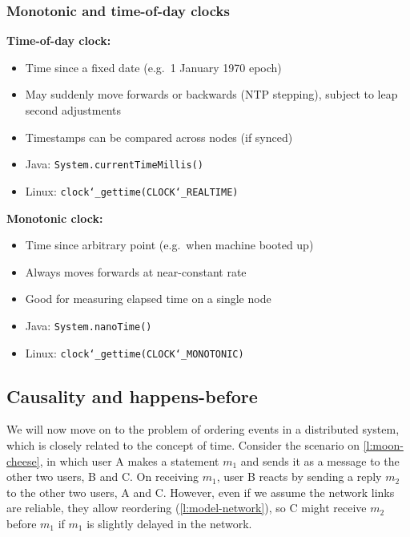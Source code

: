 \begin{frame}
    \label{s:monotonic-comparison}
    \frametitle{Monotonic and time-of-day clocks}
    \textbf{Time-of-day clock:}
    \begin{itemize}
        \item<1-> Time since a fixed date (e.g.\ 1 January 1970 epoch)
        \item<2-> May suddenly move forwards or backwards (NTP stepping), subject to leap second adjustments
        \item<3-> Timestamps can be compared across nodes (if synced)
        \item<4-> Java: \texttt{System.currentTimeMillis()}
        \item<4-> Linux: \texttt{clock\char`_gettime(CLOCK\char`_REALTIME)}\\[1em]
    \end{itemize}
    \textbf{Monotonic clock:}
    \begin{itemize}
        \item<1-> Time since arbitrary point (e.g.\ when machine booted up)
        \item<2-> Always moves forwards at near-constant rate
        \item<3-> Good for measuring elapsed time on a single node
        \item<4-> Java: \texttt{System.nanoTime()}
        \item<4-> Linux: \texttt{clock\char`_gettime(CLOCK\char`_MONOTONIC)}
    \end{itemize}
\end{frame}
\label{l:monotonic-comparison}

\subsection{Causality and happens-before}\label{sec:causality}

We will now move on to the problem of ordering events in a distributed system, which is closely related to the concept of time.
Consider the scenario on \autoref{l:moon-cheese}, in which user A makes a statement $m_1$ and sends it as a message to the other two users, B and C.
On receiving $m_1$, user B reacts by sending a reply $m_2$ to the other two users, A and C.
However, even if we assume the network links are reliable, they allow reordering (\autoref{l:model-network}), so C might receive $m_2$ before $m_1$ if $m_1$ is slightly delayed in the network.

